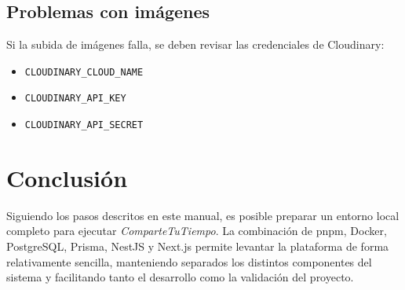 \subsection{Problemas con imágenes}

Si la subida de imágenes falla, se deben revisar las credenciales de Cloudinary:

\begin{itemize}
    \item \texttt{CLOUDINARY\_CLOUD\_NAME}
    \item \texttt{CLOUDINARY\_API\_KEY}
    \item \texttt{CLOUDINARY\_API\_SECRET}
\end{itemize}

\section{Conclusión}

Siguiendo los pasos descritos en este manual, es posible preparar un entorno local completo para ejecutar \textit{ComparteTuTiempo}. La combinación de pnpm, Docker, PostgreSQL, Prisma, NestJS y Next.js permite levantar la plataforma de forma relativamente sencilla, manteniendo separados los distintos componentes del sistema y facilitando tanto el desarrollo como la validación del proyecto.
